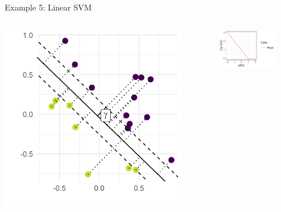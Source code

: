 \documentclass[11pt,compress,t,notes=noshow, xcolor=table]{beamer}
\begin{document}
\begin{vbframe}{Example 5: Linear SVM}
\begin{columns}[T] %
	\begin{column}{.3\textwidth}
		\begin{center}
			\includegraphics[width=1\textwidth]{figure_man/svm_geometry.png} 
		\end{center}
	\end{column} 
	\begin{column}{.3\textwidth}
	\begin{figure}
	\begin{center}
	\hspace*{-0.5cm}
		\includegraphics[width=1.3\textwidth]{figure_man/hinge.pdf}

\end{center}
\end{figure}
\end{column}
\end{columns}
\end{vbframe}
\end{document}
